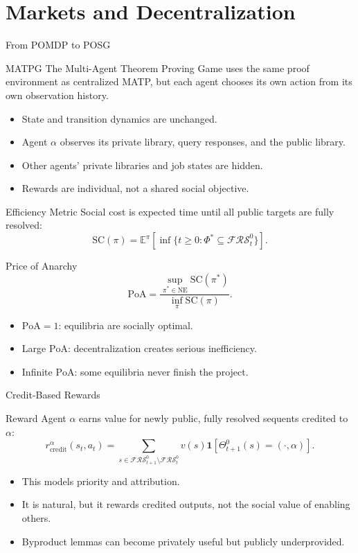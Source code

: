 \documentclass[10pt,aspectratio=169]{beamer}
\newcommand{\SC}{\mathrm{SC}}
\newcommand{\PoA}{\mathrm{PoA}}
\newcommand{\FRS}{\mathcal{FRS}}
\begin{document}
\section{Markets and Decentralization}

\begin{frame}{From POMDP to POSG}
\small
\begin{block}{MATPG}
The Multi-Agent Theorem Proving Game uses the same proof environment as centralized MATP, but each agent chooses its own action from its own observation history.
\end{block}

\begin{itemize}
  \item State and transition dynamics are unchanged.
  \item Agent $\alpha$ observes its private library, query responses, and the public library.
  \item Other agents' private libraries and job states are hidden.
  \item Rewards are individual, not a shared social objective.
\end{itemize}
\end{frame}

\begin{frame}{Efficiency Metric}
\small
Social cost is expected time until all public targets are fully resolved:
\[
\SC(\pi)=\mathbb{E}^{\pi}\left[\inf\{t\ge0:\Phi^*\subseteq\FRS^0_t\}\right].
\]

\begin{block}{Price of Anarchy}
\[
\PoA=\frac{\sup_{\pi^*\in\mathrm{NE}}\SC(\pi^*)}{\inf_{\pi}\SC(\pi)}.
\]
\end{block}

\begin{itemize}
  \item $\PoA=1$: equilibria are socially optimal.
  \item Large $\PoA$: decentralization creates serious inefficiency.
  \item Infinite $\PoA$: some equilibria never finish the project.
\end{itemize}
\end{frame}

\begin{frame}{Credit-Based Rewards}
\small
\begin{block}{Reward}
Agent $\alpha$ earns value for newly public, fully resolved sequents credited to $\alpha$:
\[
r^\alpha_{\mathrm{credit}}(s_t,a_t)=
\sum_{s\in\FRS^0_{t+1}\setminus\FRS^0_t}
v(s)\mathbf{1}[\Theta^0_{t+1}(s)=(\cdot,\alpha)].
\]
\end{block}

\begin{itemize}
  \item This models priority and attribution.
  \item It is natural, but it rewards credited outputs, not the social value of enabling others.
  \item Byproduct lemmas can become privately useful but publicly underprovided.
\end{itemize}
\end{frame}
\end{document}
